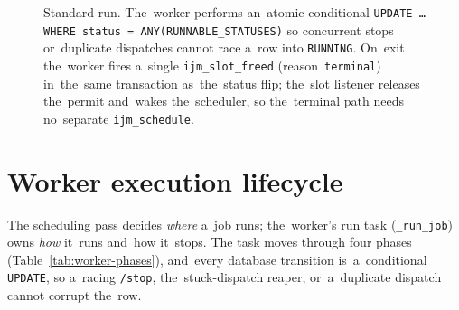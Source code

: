 \begin{figure}[H]
\centering
\footnotesize
\setlength{\unitlength}{0.7cm}
\caption{Standard run.  The~worker performs an~atomic
conditional \texttt{UPDATE \ldots WHERE status = ANY(RUNNABLE\_STATUSES)}
so concurrent stops or~duplicate dispatches cannot race a~row into
\texttt{RUNNING}.  On~exit the~worker fires a~single
\texttt{ijm\_slot\_freed} (reason~\texttt{terminal}) in~the~same
transaction as~the~status flip; the~slot listener releases the~permit
and~wakes the~scheduler, so the~terminal path needs no~separate
\texttt{ijm\_schedule}.}
\label{fig:seq-standard-run}
\end{figure}

\section{Worker execution lifecycle}\label{sec:worker-lifecycle}

The scheduling pass decides \emph{where} a~job runs; the~worker's run
task (\texttt{\_run\_job}) owns \emph{how} it~runs and~how it~stops.  The
task moves through four phases (Table~\ref{tab:worker-phases}), and~every
database transition is~a~conditional \texttt{UPDATE}, so a~racing
\texttt{/stop}, the~stuck-dispatch reaper, or~a~duplicate dispatch cannot
corrupt the~row.

